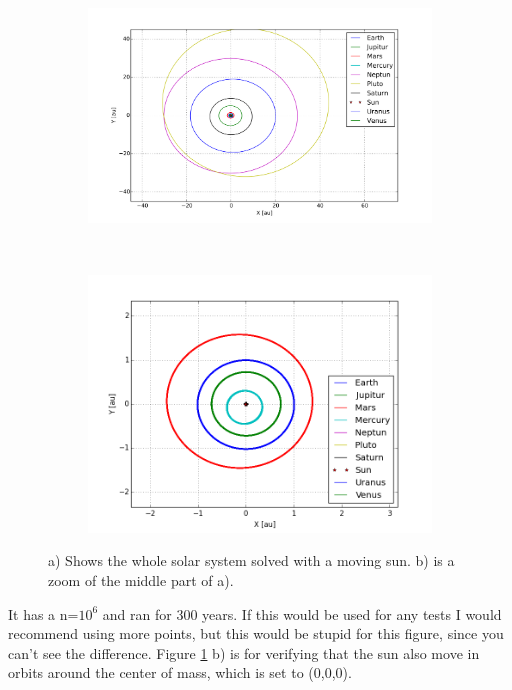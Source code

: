 \begin{figure}[H]
    \centering
    \begin{subfigure}{0.5\textwidth}
        \centering
        \includegraphics[width=\linewidth]{result/bilder/all-moving-solarsystem.png}
        \caption{}
    \end{subfigure}%
    ~ 
    \begin{subfigure}{0.5\textwidth}
        \centering
        \includegraphics[width=\linewidth]{result/bilder/all-moving-solarsystem-zoom.png}
        \caption{}
    \end{subfigure}
    \caption{a) Shows the whole solar system solved with a moving sun.  b) is a zoom of the middle part of a). }
    \label{fig:solarsystem-moving}
\end{figure}

It has a n=$10^6$ and ran for 300 years. If this would be used for any tests I would recommend using more points, but this would be stupid for this figure, since you can't see the difference. Figure \ref{fig:solarsystem-moving} b) is for verifying that the sun also move in orbits around the center of mass, which is set to (0,0,0).


